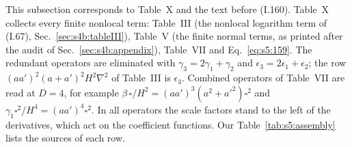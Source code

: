 \documentclass[aps,prd,onecolumn,10pt,nofootinbib,floatfix]{revtex4-2}
\newcommand{\eqI}[1]{(I.#1)}
\begin{document}
This subsection corresponds to Table~X and the text before \eqI{160}.
Table~X collects every finite nonlocal term: Table~III (the nonlocal logarithm term of \eqI{67}, Sec.~\ref{sec:s4b:tableIII}), Table~V (the finite normal terms, as printed after the audit of Sec.~\ref{sec:s4b:appendix}), Table~VII and Eq.~\eqref{eq:s5:159}.
The redundant operators are eliminated with $\gamma_3=2\gamma_1+\gamma_2$ and $\epsilon_3=2\epsilon_1+\epsilon_2$; the row $(aa')^2(a+a')^2H^2\nabla^2$ of Table~III is $\epsilon_3$.
Combined operators of Table~VII are read at $D=4$, for example $\beta\,\square/H^2=(aa')^3(a^2+a'^2)\square^2$ and $\gamma_1\square^2/H^4=(aa')^4\square^2$.
In all operators the scale factors stand to the left of the derivatives, which act on the coefficient functions.
Our Table~\ref{tab:s5:assembly} lists the sources of each row.
\end{document}
